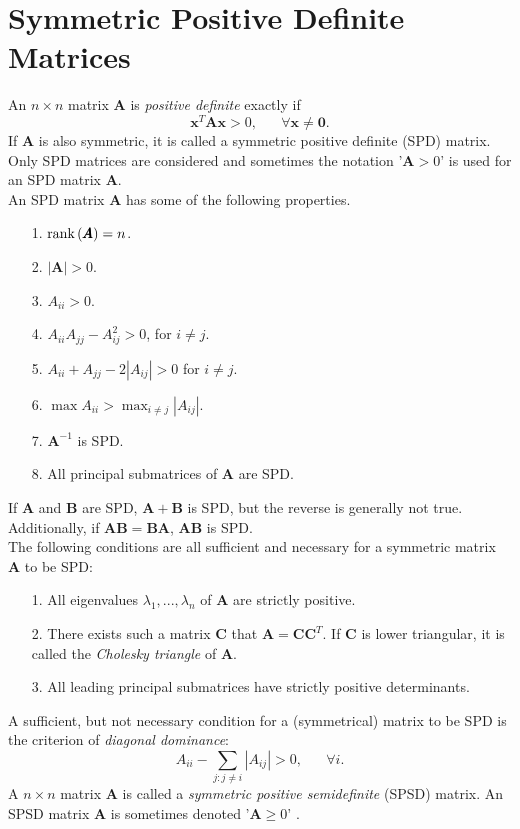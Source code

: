\section{Symmetric Positive Definite Matrices}
An $n \times n$ matrix $\pmb{A}$ is \textit{positive definite} exactly if
\begin{equation*}
    \pmb{x}^T\pmb{A}\pmb{x}>0,\hspace{20pt}\forall\pmb{x}\neq\pmb{0}.
\end{equation*}
If $\pmb{A}$ is also symmetric, it is called a symmetric positive definite (SPD) matrix. Only SPD matrices are considered and sometimes the notation '$\pmb{A}>0$' is used for an SPD matrix $\pmb{A}$. \\
An SPD matrix $\pmb{A}$ has some of the following properties.
\begin{itemize}
    \item[1.] $\hbox{rank}\left(\pmb{A}\right)=n$.
    \item[2.] $|\pmb{A}|>0$.
    \item[3.] $A_{ii}>0$.
    \item[4.] $A_{ii}A_{jj}-A_{ij}^2>0$, for $i\neq j$.
    \item[5.] $A_{ii} + A_{jj}-2|A_{ij}|>0$ for $i\neq j$.
    \item[6.] $\max A_{ii}>\max_{i\neq j}|A_{ij}|$.
    \item[7.] $\pmb{A}^{-1}$ is SPD.
    \item[8.] All principal submatrices of $\pmb{A}$ are SPD.
\end{itemize}
If $\pmb{A}$ and $\pmb{B}$ are SPD, $\pmb{A}+\pmb{B}$ is SPD, but the reverse is generally not true. Additionally, if $\pmb{AB}=\pmb{BA}$, $\pmb{AB}$ is SPD. \\
The following conditions are all sufficient and necessary for a symmetric matrix $\pmb{A}$ to be SPD:
\begin{itemize}
    \item[1.] All eigenvalues $\lambda_1,...,\lambda_n$ of $\pmb{A}$ are strictly positive.
    \item[2.] There exists such a matrix $\pmb{C}$ that $\pmb{A}=\pmb{CC}^T$. If $\pmb{C}$ is lower triangular, it is called the \textit{Cholesky triangle} of $\pmb{A}$.
    \item[3.] All leading principal submatrices have strictly positive determinants.
\end{itemize}    
A sufficient, but not necessary condition for a (symmetrical) matrix to be SPD is the criterion of \textit{diagonal dominance}:
    \begin{equation*}
        A_{ii}-\sum_{j:j\neq i}|A_{ij}|>0,\hspace{20pt}\forall i.
    \end{equation*}
    A $n\times n$ matrix $\pmb{A}$ is called a \textit{symmetric positive semidefinite} (SPSD) matrix. An SPSD matrix $\pmb{A}$ is sometimes denoted '$\pmb{A}\geq0$' \autocite[][18--19]{rue2005gaussian}.
\clearpage
